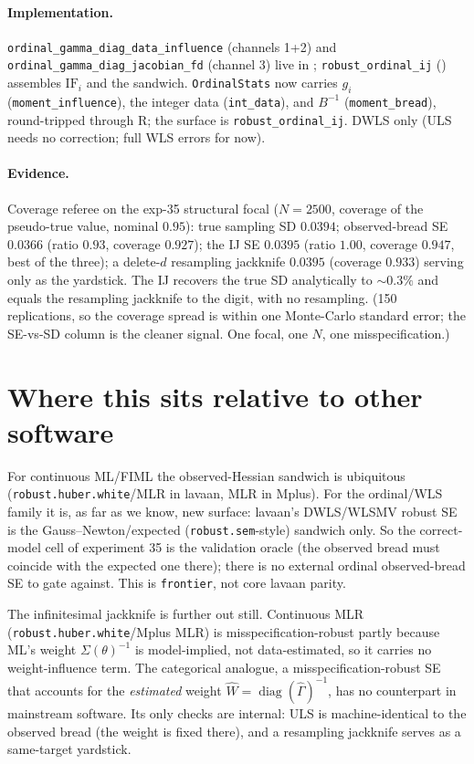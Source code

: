 \documentclass[11pt]{article}
\begin{document}
\paragraph{Implementation.} \texttt{ordinal\_gamma\_diag\_data\_influence}
(channels 1+2) and \texttt{ordinal\_gamma\_diag\_jacobian\_fd} (channel 3) live in
; \texttt{robust\_ordinal\_ij}
() assembles $\mathrm{IF}_i$ and the sandwich.
\texttt{OrdinalStats} now carries $g_i$ (\texttt{moment\_influence}), the integer
data (\texttt{int\_data}), and $B^{-1}$ (\texttt{moment\_bread}), round-tripped
through R; the surface is \texttt{robust\_ordinal\_ij}. DWLS only (ULS needs no
correction; full WLS errors for now).

\paragraph{Evidence.} Coverage referee on the exp-35 structural focal ($N=2500$,
coverage of the pseudo-true value, nominal $0.95$): true sampling SD $0.0394$;
observed-bread SE $0.0366$ (ratio $0.93$, coverage $0.927$); the IJ SE $0.0395$
(ratio $1.00$, coverage $0.947$, best of the three); a delete-$d$ resampling
jackknife $0.0395$ (coverage $0.933$) serving only as the yardstick. The IJ
recovers the true SD analytically to $\sim0.3\%$ and equals the resampling
jackknife to the digit, with no resampling. (150 replications, so the
coverage spread is within one Monte-Carlo standard error; the SE-vs-SD column is
the cleaner signal. One focal, one $N$, one misspecification.)

\section*{Where this sits relative to other software}

For continuous ML/FIML the observed-Hessian sandwich is ubiquitous
(\texttt{robust.huber.white}/MLR in lavaan, MLR in Mplus). For the
ordinal/WLS family it is, as far as we know, new surface: lavaan's DWLS/WLSMV
robust SE is the Gauss--Newton/expected (\texttt{robust.sem}-style) sandwich
only. So the correct-model cell of experiment 35 is the validation oracle (the
observed bread must coincide with the expected one there); there is no external
ordinal observed-bread SE to gate against. This is \texttt{frontier}, not
core lavaan parity.

The infinitesimal jackknife is further out still. Continuous MLR
(\texttt{robust.huber.white}/Mplus MLR) is misspecification-robust partly because
ML's weight $\Sigma(\theta)^{-1}$ is model-implied, not data-estimated, so it
carries no weight-influence term. The categorical analogue, a
misspecification-robust SE that accounts for the \emph{estimated} weight
$\hat W=\operatorname{diag}(\hat\Gamma)^{-1}$, has no counterpart in mainstream
software. Its only checks are internal: ULS is machine-identical to the observed
bread (the weight is fixed there), and a resampling jackknife serves as a
same-target yardstick.
\end{document}
